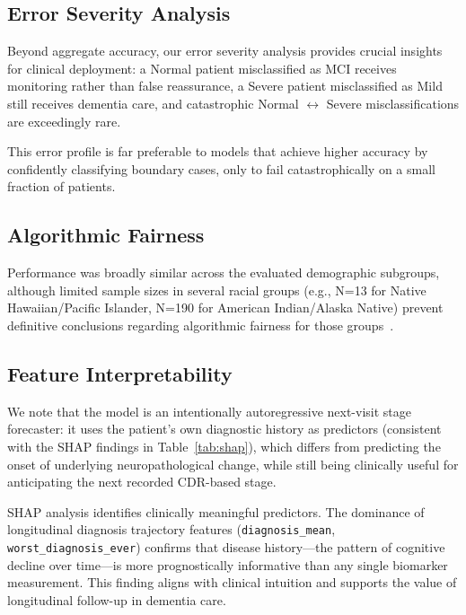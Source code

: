 \documentclass[preprint,12pt]{elsarticle}
\begin{document}
\subsection{Error Severity Analysis}

Beyond aggregate accuracy, our error severity analysis provides crucial insights for clinical deployment: a Normal patient misclassified as MCI receives monitoring rather than false reassurance, a Severe patient misclassified as Mild still receives dementia care, and catastrophic Normal $\leftrightarrow$ Severe misclassifications are exceedingly rare.

This error profile is far preferable to models that achieve higher accuracy by confidently classifying boundary cases, only to fail catastrophically on a small fraction of patients.

\subsection{Algorithmic Fairness}

Performance was broadly similar across the evaluated demographic subgroups, although limited sample sizes in several racial groups (e.g., N=13 for Native Hawaiian/Pacific Islander, N=190 for American Indian/Alaska Native) prevent definitive conclusions regarding algorithmic fairness for those groups~\cite{rajkomar2018,gianfrancesco2018}.

\subsection{Feature Interpretability}

We note that the model is an intentionally autoregressive next-visit stage forecaster: it uses the patient's own diagnostic history as predictors (consistent with the SHAP findings in Table~\ref{tab:shap}), which differs from predicting the onset of underlying neuropathological change, while still being clinically useful for anticipating the next recorded CDR-based stage.

SHAP analysis identifies clinically meaningful predictors. The dominance of longitudinal diagnosis trajectory features (\texttt{diagnosis\_mean}, \texttt{worst\_diagnosis\_ever}) confirms that disease history---the pattern of cognitive decline over time---is more prognostically informative than any single biomarker measurement. This finding aligns with clinical intuition and supports the value of longitudinal follow-up in dementia care.
\end{document}
